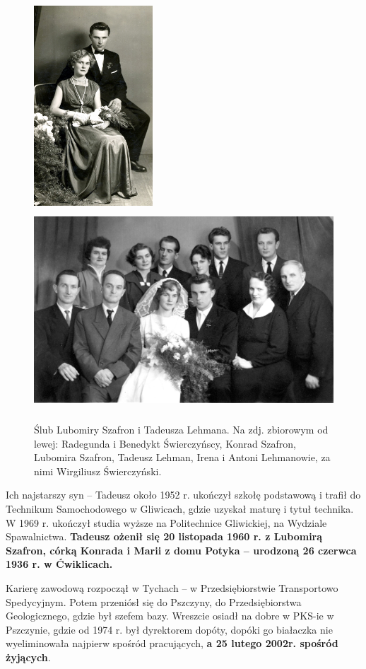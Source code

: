 \begin{figure}[!h]
\begin{center}
\includegraphics[height=75mm]{photo/tadeusz_lubomira_lehman_slub_1.jpg}
\includegraphics[height=75mm]{photo/tadeusz_lubomira_lehman_slub_2.jpg}
\caption[Ślub Lubomiry Szafron i Tadeusza Lehmana]{Ślub Lubomiry Szafron i Tadeusza Lehmana. Na zdj. zbiorowym od lewej: Radegunda i Benedykt Świerczyńscy, Konrad Szafron, Lubomira Szafron, Tadeusz Lehman, Irena i Antoni Lehmanowie, za nimi Wirgiliusz Świerczyński.}
\label{rys:tadeusz_lubomira_lehman_slub}
\end{center}
\end{figure}

Ich najstarszy syn -- Tadeusz około 1952 r. ukończył szkołę podstawową i trafił do Technikum Samochodowego w Gliwicach, gdzie uzyskał maturę i tytuł technika. W 1969 r. ukończył studia wyższe na Politechnice Gliwickiej, na Wydziale Spawalnictwa. \textbf{Tadeusz ożenił się 20 listopada 1960 r. z Lubomirą Szafron, córką Konrada i Marii z domu Potyka – urodzoną 26 czerwca 1936 r. w Ćwiklicach.}

Karierę zawodową rozpoczął w Tychach -- w Przedsiębiorstwie Transportowo Spedycyjnym. Potem przeniósł się do Pszczyny, do Przedsiębiorstwa Geologicznego, gdzie był szefem bazy. Wreszcie osiadł na dobre w PKS-ie w Pszczynie, gdzie od 1974 r. był dyrektorem dopóty, dopóki go białaczka nie wyeliminowała najpierw spośród pracujących, \textbf{a 25 lutego 2002r. spośród żyjących}.

